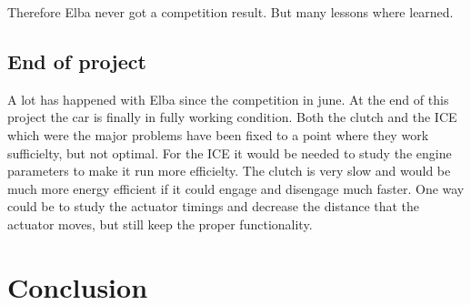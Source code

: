 Therefore Elba never got a competition result. But many lessons where learned.

\subsection{End of project}

A lot has happened with Elba since the competition in june. At the end of this project the car is finally in fully working condition. Both the clutch and the ICE which were the major problems have been fixed to a point where they work sufficielty, but not optimal. For the ICE it would be needed to study the engine parameters to make it run more efficielty. The clutch is very slow and would be much more energy efficient if it could engage and disengage much faster. One way could be to study the actuator timings and decrease the distance that the actuator moves, but still keep the proper functionality.

\section{Conclusion}
